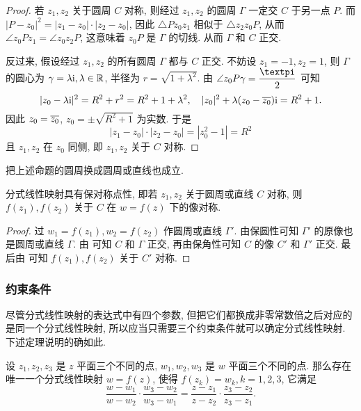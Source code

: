\begin{proof}
  若 $z_1,z_2$ 关于圆周 $C$ 对称, 则经过 $z_1,z_2$ 的圆周 $\Gamma$ 一定交 $C$ 于另一点 $P$.
  而 $|P-z_0|^2=|z_1-z_0|\cdot|z_2-z_0|$, 因此 $\triangle Pz_0z_1$ 相似于 $\triangle z_2z_0P$, 从而 $\angle z_0Pz_1=\angle z_0z_2P$, 这意味着 $z_0P$ 是 $\Gamma$ 的切线.
  从而 $\Gamma$ 和 $C$ 正交.

  反过来, 假设经过 $z_1,z_2$ 的所有圆周 $\Gamma$ 都与 $C$ 正交.
  不妨设 $z_1=-1,z_2=1$, 则 $\Gamma$ 的圆心为 $\gamma=\lambda\mathrm{i},\lambda\in{\mathbb{R}}$, 半径为 $r=\sqrt{1+\lambda^2}$.
  由 $\angle z_0 P\gamma=\dfrac\cpi2$ 可知
  \[
     |z_0-\lambda\mathrm{i}|^2
    =R^2+r^2
    =R^2+1+\lambda^2,\quad
     |z_0|^2+\lambda(z_0-\overline{z_0})\mathrm{i}
    =R^2+1.
  \]
  因此 $z_0=\overline{z_0}$, $z_0=\pm\sqrt{R^2+1}$ 为实数.
  于是
  \[
    |z_1-z_0|\cdot|z_2-z_0|=|z_0^2-1|=R^2
  \]
  且 $z_1,z_2$ 在 $z_0$ 同侧, 即 $z_1,z_2$ 关于 $C$ 对称.
\end{proof}

把上述命题的圆周换成圆周或直线也成立.

\begin{theorem}
  分式线性映射具有保对称点性, 即若 $z_1,z_2$ 关于圆周或直线 $C$ 对称, 则 $f(z_1),f(z_2)$ 关于 $C$ 在 $w=f(z)$ 下的像对称.
\end{theorem}

\begin{proof}
  过 $w_1=f(z_1),w_2=f(z_2)$ 作圆周或直线 $\Gamma'$.
  由保圆性可知 $\Gamma'$ 的原像也是圆周或直线 $\Gamma$.
  由 可知 $C$ 和 $\Gamma$ 正交, 再由保角性可知 $C$ 的像 $C'$ 和 $\Gamma'$ 正交.
  最后由 可知 $f(z_1),f(z_2)$ 关于 $C'$ 对称.
\end{proof}


\subsubsection{约束条件}

尽管分式线性映射的表达式中有四个参数, 但把它们都换成非零常数倍之后对应的是同一个分式线性映射, 所以应当只需要三个约束条件就可以确定分式线性映射.
下述定理说明的确如此.

\begin{theorem}
  \label{thm:three-points-determine-fractal-transform}
  设 $z_1,z_2,z_3$ 是 $z$ 平面三个不同的点, $w_1,w_2,w_3$ 是 $w$ 平面三个不同的点.
  那么存在唯一一个分式线性映射 $w=f(z)$, 使得 $f(z_k)=w_k,k=1,2,3$, 它满足
  \[
     \frac{w-w_1}{w-w_2}\cdot\frac{w_3-w_2}{w_3-w_1}
    =\frac{z-z_1}{z-z_2}\cdot\frac{z_3-z_2}{z_3-z_1}.
  \]
\end{theorem}

